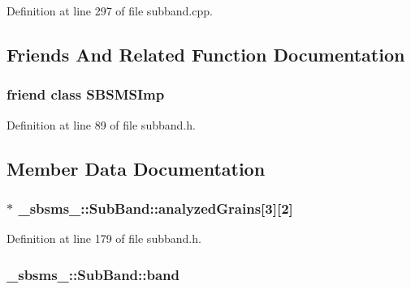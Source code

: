 Definition at line 297 of file subband.\+cpp.



\subsection{Friends And Related Function Documentation}
\subsubsection[{\texorpdfstring{S\+B\+S\+M\+S\+Imp}{SBSMSImp}}]{\setlength{\rightskip}{0pt plus 5cm}friend class {\bf S\+B\+S\+M\+S\+Imp}\hspace{0.3cm}{\ttfamily [friend]}}\hypertarget{class__sbsms___1_1_sub_band_ae4bb3357a0671b046cff2cadf6c5ab2b}{}\label{class__sbsms___1_1_sub_band_ae4bb3357a0671b046cff2cadf6c5ab2b}


Definition at line 89 of file subband.\+h.



\subsection{Member Data Documentation}
\subsubsection[{\texorpdfstring{analyzed\+Grains}{analyzedGrains}}]{$\ast$ \+\_\+sbsms\+\_\+\+::\+Sub\+Band\+::analyzed\+Grains\mbox{[}3\mbox{]}\mbox{[}2\mbox{]}\hspace{0.3cm}{\ttfamily [protected]}}\hypertarget{class__sbsms___1_1_sub_band_a6b1b070cda1ea01bf08107b700558b02}{}\label{class__sbsms___1_1_sub_band_a6b1b070cda1ea01bf08107b700558b02}


Definition at line 179 of file subband.\+h.

\subsubsection[{\texorpdfstring{band}{band}}]{ \+\_\+sbsms\+\_\+\+::\+Sub\+Band\+::band\hspace{0.3cm}{\ttfamily [protected]}}\hypertarget{class__sbsms___1_1_sub_band_a865ef147bdcfecee221ae3eb84aa54d2}{}\label{class__sbsms___1_1_sub_band_a865ef147bdcfecee221ae3eb84aa54d2}


